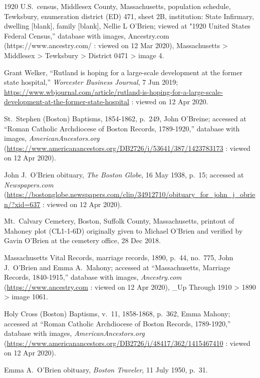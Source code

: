 \begin{thebibliography}{999}
	1920 U.S.\ census, Middlesex County, Massachusetts, population schedule, Tewksbury, enumeration district (ED) 471, sheet 2B, institution: State Infirmary, dwelling [blank], family [blank], Nellie L O'Brien; viewed at "1920 United States Federal Census,” database with images, Ancestry.com (https://www.ancestry.com/ : viewed on 12 Mar 2020), Massachusetts > Middlesex > Tewksbury > District 0471 > image 4.
	
	Grant Welker, ``Rutland is hoping for a large-scale development at the former state hospital,'' \textit{Worcester Business Journal}, 7 Jun 2019;  \url{https://www.wbjournal.com/article/rutland-is-hoping-for-a-large-scale-development-at-the-former-state-hospital} : viewed on 12 Apr 2020.
	
	St.\ Stephen (Boston) Baptisms, 1854-1862, p.\ 249, John O'Breine; accessed at ``Roman Catholic Archdiocese of Boston Records, 1789-1920,'' database with images, \textit{AmericanAncestors.org} (\url{https://www.americanancestors.org/DB2726/i/53641/387/1423783173} : viewed on 12 Apr 2020).
	
	John J.\ O'Brien obituary, \textit{The Boston Globe}, 16 May 1938, p.\ 15; accessed at \textit{Newspapers.com} (\url{https://bostonglobe.newspapers.com/clip/34912710/obituary_for_john_j_obrien/?xid=637} : viewed on 12 Apr 2020).
	
	Mt.\ Calvary Cemetery, Boston, Suffolk County, Massachusetts, printout of Mahoney plot (CL1-1-6D) originally given to Michael O'Brien and verified by Gavin O'Brien at the cemetery office, 28 Dec 2018.
	
	Massachusetts Vital Records, marriage records, 1890, p.\ 44, no.\ 775, John J.\ O'Brien and Emma A.\ Mahony; accessed at ``Massachusetts, Marriage Records, 1840-1915,'' database with images, \textit{Ancestry.com} (\url{https://www.ancestry.com} : viewed on 12 Apr 2020), \_Up Through 1910 > 1890 > image 1061.
	
	Holy Cross (Boston) Baptisms, v.\ 11, 1858-1868, p.\ 362, Emma Mahony; accessed at ``Roman Catholic Archdiocese of Boston Records, 1789-1920,'' database with images, \textit{AmericanAncestors.org} (\url{https://www.americanancestors.org/DB2726/i/48417/362/1415467410} : viewed on 12 Apr 2020).
	
	Emma A.\ O'Brien obituary, \textit{Boston Traveler}, 11 July 1950, p.\ 31.
	

\end{thebibliography}
